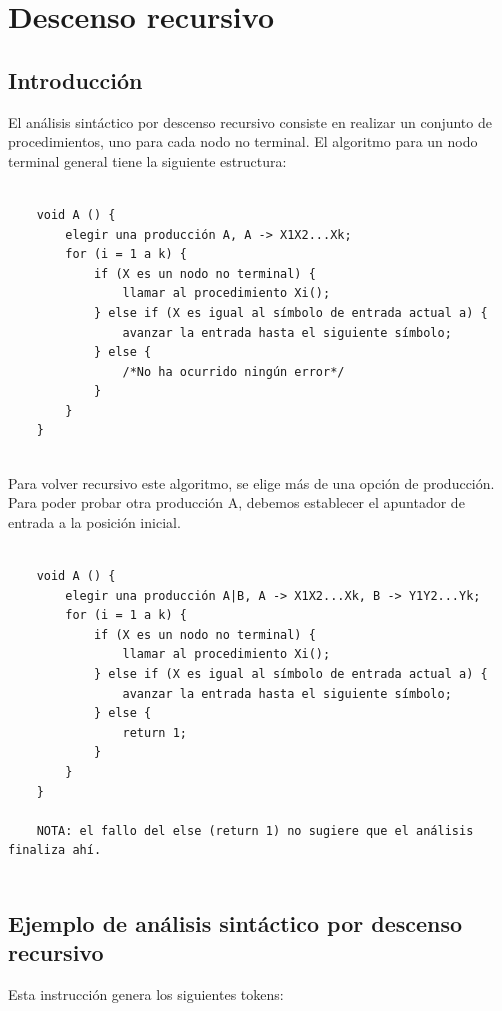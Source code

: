 \documentclass[11pt, english]{article}
\begin{document}
	\section{Descenso recursivo}
	
	\subsection{Introducción}
	
	El análisis sintáctico por descenso recursivo consiste en realizar un conjunto de procedimientos, uno para cada nodo no terminal. El algoritmo para un nodo terminal general tiene la siguiente estructura:
	
	\begin{lstlisting}
	
	void A () {
		elegir una producción A, A -> X1X2...Xk;
		for (i = 1 a k) {
			if (X es un nodo no terminal) {
				llamar al procedimiento Xi();
			} else if (X es igual al símbolo de entrada actual a) {
				avanzar la entrada hasta el siguiente símbolo;
			} else {
				/*No ha ocurrido ningún error*/
			}
		}
	}
	
	\end{lstlisting}
	
	Para volver recursivo este algoritmo, se elige más de una opción de producción. Para poder probar otra producción A, debemos establecer el apuntador de entrada a la posición inicial.
	
	\begin{lstlisting}
	
	void A () {
		elegir una producción A|B, A -> X1X2...Xk, B -> Y1Y2...Yk;
		for (i = 1 a k) {
			if (X es un nodo no terminal) {
				llamar al procedimiento Xi();
			} else if (X es igual al símbolo de entrada actual a) {
				avanzar la entrada hasta el siguiente símbolo;
			} else {
				return 1;
			}
		}
	}
	
	NOTA: el fallo del else (return 1) no sugiere que el análisis finaliza ahí.
	
	\end{lstlisting}
	
	\newpage
	
	
	
	\subsection{Ejemplo de análisis sintáctico por descenso recursivo}
	
	Esta instrucción genera los siguientes tokens:
	
\end{document}
